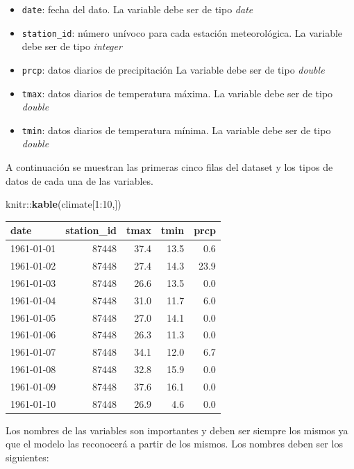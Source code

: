\documentclass[
]{article}
\newenvironment{Shaded}{}{}
\newcommand{\DecValTok}[1]{\textcolor[rgb]{0.25,0.63,0.44}{#1}}
\newcommand{\KeywordTok}[1]{\textcolor[rgb]{0.00,0.44,0.13}{\textbf{#1}}}
\newcommand{\NormalTok}[1]{#1}
\newcommand{\OperatorTok}[1]{\textcolor[rgb]{0.40,0.40,0.40}{#1}}
\providecommand{\tightlist}{%
  \setlength{\itemsep}{0pt}\setlength{\parskip}{0pt}}
\begin{document}
\begin{itemize}
\tightlist
\item
  \texttt{date}: fecha del dato. La variable debe ser de tipo \emph{date}
\item
  \texttt{station\_id}: número unívoco para cada estación meteorológica. La variable debe ser de tipo \emph{integer}
\item
  \texttt{prcp}: datos diarios de precipitación La variable debe ser de tipo \emph{double}
\item
  \texttt{tmax}: datos diarios de temperatura máxima. La variable debe ser de tipo \emph{double}
\item
  \texttt{tmin}: datos diarios de temperatura mínima. La variable debe ser de tipo \emph{double}
\end{itemize}

A continuación se muestran las primeras cinco filas del dataset y los tipos de datos de cada una de las variables.

\begin{Shaded}
\begin{Highlighting}[]
\NormalTok{knitr}\OperatorTok{::}\KeywordTok{kable}\NormalTok{(climate[}\DecValTok{1}\OperatorTok{:}\DecValTok{10}\NormalTok{,])}
\end{Highlighting}
\end{Shaded}

\begin{tabular}{l|r|r|r|r}
\hline
date & station\_id & tmax & tmin & prcp\\
\hline
1961-01-01 & 87448 & 37.4 & 13.5 & 0.6\\
\hline
1961-01-02 & 87448 & 27.4 & 14.3 & 23.9\\
\hline
1961-01-03 & 87448 & 26.6 & 13.5 & 0.0\\
\hline
1961-01-04 & 87448 & 31.0 & 11.7 & 6.0\\
\hline
1961-01-05 & 87448 & 27.0 & 14.1 & 0.0\\
\hline
1961-01-06 & 87448 & 26.3 & 11.3 & 0.0\\
\hline
1961-01-07 & 87448 & 34.1 & 12.0 & 6.7\\
\hline
1961-01-08 & 87448 & 32.8 & 15.9 & 0.0\\
\hline
1961-01-09 & 87448 & 37.6 & 16.1 & 0.0\\
\hline
1961-01-10 & 87448 & 26.9 & 4.6 & 0.0\\
\hline
\end{tabular}

Los nombres de las variables son importantes y deben ser siempre los mismos ya que el modelo las reconocerá a partir de los mismos. Los nombres deben ser los siguientes:
\end{document}
